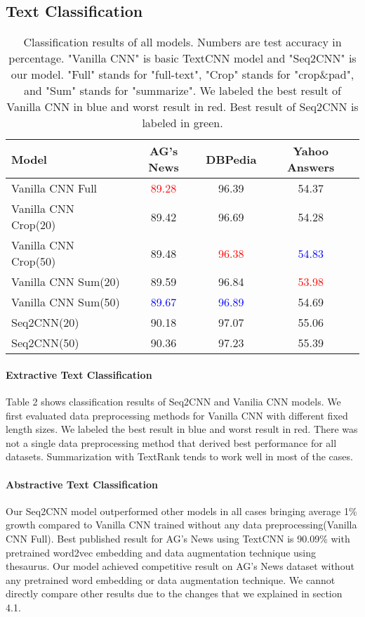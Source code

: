 \documentclass{article}
\begin{document}
\subsection{Text Classification}
\begin{table}[!ht]
  \caption{Classification results of all models. Numbers are test accuracy in percentage. "Vanilla CNN" is basic TextCNN\cite{DBLP:journals/corr/Kim14f} model and "Seq2CNN" is our model. "Full" stands for "full-text", "Crop" stands for "crop\&pad", and "Sum" stands for "summarize". We labeled the best result of Vanilla CNN in blue and worst result in red. Best result of Seq2CNN is labeled in green.}
  \label{table3}
  \centering
  \begin{tabular}{lccc}
    \toprule
    Model & AG's News & DBPedia &Yahoo Answers\\
    \midrule
    Vanilla CNN Full &\textcolor{red}{89.28}  &96.39 &54.37  \\
    Vanilla CNN Crop(20)  &89.42	&96.69	&54.28  \\
    Vanilla CNN Crop(50)  &89.48	&\textcolor{red}{96.38}	&\textcolor{blue}{54.83}  \\
    Vanilla CNN Sum(20)  &89.59	&96.84	&\textcolor{red}{53.98}  \\
    Vanilla CNN Sum(50)  &\textcolor{blue}{89.67}	&\textcolor{blue}{96.89}	&54.69 \\
    Seq2CNN(20) &90.18	&97.07	&55.06 \\
    Seq2CNN(50) &\textcolor{green!55!blue}{90.36}	&\textcolor{green!55!blue}{97.23}	&\textcolor{green!55!blue}{55.39} \\
    \bottomrule
  \end{tabular}
\end{table}

\paragraph{Extractive Text Classification}
Table 2 shows classification results of Seq2CNN and Vanilia CNN models. We first evaluated data preprocessing methods for Vanilla CNN with different fixed length sizes. We labeled the best result in blue and worst result in red. There was not a single data preprocessing method that derived best performance for all datasets. Summarization with TextRank\cite{mihalcea-tarau:2004:EMNLP} tends to work well in most of the cases.     
\paragraph{Abstractive Text Classification}
Our Seq2CNN model outperformed other models in all cases bringing average 1\% growth compared to Vanilla CNN trained without any data preprocessing(Vanilla CNN Full). Best published result for AG's News using TextCNN\cite{DBLP:journals/corr/ZhangZL15} is 90.09\% with pretrained word2vec\cite{DBLP:journals/corr/MikolovSCCD13} embedding and data augmentation technique\cite{DBLP:journals/corr/ZhangZL15} using thesaurus. Our model achieved competitive result on AG's News dataset without any pretrained word embedding or data augmentation technique. We cannot directly compare other results due to the changes that we explained in section 4.1. 
\end{document}
